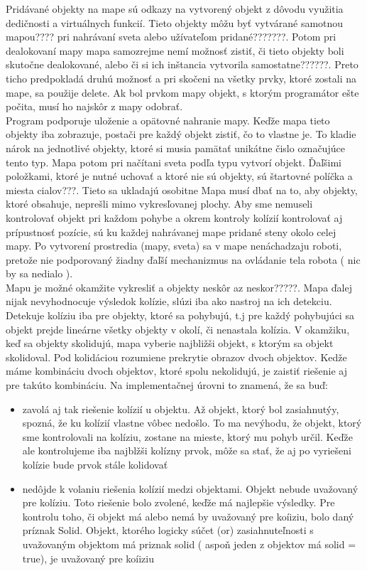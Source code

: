 Pridávané objekty na mape sú odkazy na vytvorený objekt z dôvodu využitia dedičnosti a virtuálnych funkcií. Tieto objekty môžu byť vytvárané samotnou mapou???? pri nahrávaní sveta alebo užívateľom pridané???????. Potom pri dealokovaní mapy mapa samozrejme nemí možnosť zistiť, či tieto objekty boli skutočne dealokované, alebo či si ich inštancia vytvorila samostatne??????. Preto ticho predpokladá druhú možnosť a pri skočeni na všetky prvky, ktoré zostali na mape, sa použije delete. Ak bol prvkom mapy objekt, s ktorým programátor ešte počita, musí ho najskôr z mapy odobrať. %
\\
Program podporuje uloženie a opätovné nahranie mapy. Keďže mapa tieto objekty iba zobrazuje, postači pre každý objekt zistiť, čo to vlastne je. To kladie nárok na jednotlivé objekty, ktoré si musia pamätať unikátne čislo označujúce tento typ. Mapa potom pri načítani sveta podľa typu vytvorí objekt. Ďaľšimi položkami, ktoré je nutné uchovať a ktoré nie sú objekty, sú štartovné políčka a miesta cialov???. Tieto sa ukladajú osobitne %
Mapa musí dbať na to, aby objekty, ktoré obsahuje, neprešli mimo vykresľovanej plochy. Aby sme nemuseli kontrolovať objekt pri každom pohybe a okrem kontroly kolízií kontrolovať aj prípustnosť pozície, sú ku každej nahrávanej mape pridané steny okolo celej mapy. 
Po vytvorení prostredia (mapy, sveta) sa v mape nenáchadzaju roboti, pretože nie podporovaný žiadny ďaľší mechanizmus na ovládanie tela robota ( nic by sa nedialo ). \\
Mapu je možné okamžite vykresliť a objekty neskôr az neskor?????.
Mapa ďalej nijak nevyhodnocuje výsledok kolízie, slúzi iba ako nastroj na ich detekciu. Detekuje kolíziu iba pre objekty, ktoré sa pohybujú, t.j pre každý pohybujúci sa objekt prejde lineárne všetky objekty v okolí, či nenastala kolízia. V okamžiku, keď sa objekty skolidujú, mapa vyberie najbližši objekt, s ktorým sa objekt skolidoval. Pod kolidáciou rozumiene prekrytie obrazov dvoch objektov. Kedže máme kombináciu dvoch objektov, ktoré spolu nekolidujú, je zaistiť riešenie aj pre takúto kombináciu. Na implementačnej úrovni to znamená, že sa buď:
\begin{itemize} %
\item zavolá aj tak riešenie kolízií u objektu. Až objekt, ktorý bol zasiahnutýy, spozná, že ku kolízií vlastne vôbec nedošlo. To ma nevýhodu, že objekt, ktorý sme kontrolovali na kolíziu, zostane na mieste, ktorý mu pohyb určil. Keďže ale kontrolujeme iba najblžši kolízny prvok, môže sa stať, že aj po vyriešeni kolízie bude prvok stále kolidovať
\item nedôjde k volaniu riešenia kolízií medzi objektami. Objekt nebude uvažovaný pre kolíziu. Toto riešenie bolo zvolené, keďže má najlepšie výsledky. Pre kontrolu toho, či objekt má alebo nemá by uvažovaný pre koíiziu, bolo daný príznak Solid. Objekt, ktorého logicky súčet (or) zasiahnuteľnosti s uvažovaným objektom má priznak solid ( aspoň jeden z objektov má solid =  true),  je uvažovaný pre koíiziu
\end{itemize}
